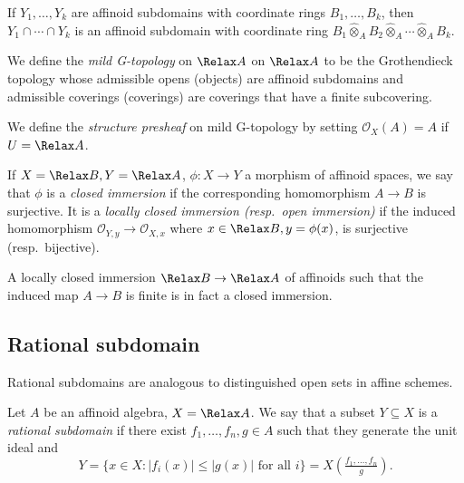 \documentclass[a4paper]{article}
\renewcommand*{\O}{\mathcal{O}}
\let\Sp\Relax
\DeclareMathOperator{\Sp}{Sp} %
\begin{document}
\begin{corollary}
  If \(Y_1, \dots, Y_k\) are affinoid subdomains with coordinate rings \(B_1, \dots, B_k\), then \(Y_1 \cap \cdots \cap Y_k\) is an affinoid subdomain with coordinate ring \(B_1 \hat \otimes_A B_2 \hat \otimes_A \cdots \hat \otimes_A B_k\).
\end{corollary}

\begin{definition}
  We define the \emph{mild G-topology} on \(\Sp A\) on \(\Sp A\) to be the Grothendieck topology whose admissible opens (objects) are affinoid subdomains and admissible coverings (coverings) are coverings that have a finite subcovering.
\end{definition}

We define the \emph{structure presheaf} on mild G-topology by setting \(\O_X(A) = A\) if \(U = \Sp A\).

\begin{definition}
  If \(X = \Sp B, Y = \Sp A\), \(\phi: X \to Y\) a morphism of affinoid spaces, we say that \(\phi\) is a \emph{closed immersion} if the corresponding homomorphism \(A \to B\) is surjective. It is a \emph{locally closed immersion (resp.\ open immersion)} if the induced homomorphism \(\O_{Y, y} \to \O_{X, x}\) where \(x \in \Sp B, y = \phi(x)\), is surjective (resp.\ bijective).
\end{definition}

\begin{ex}
  A locally closed immersion \(\Sp B \to \Sp A\) of affinoids such that the induced map \(A \to B\) is finite is in fact a closed immersion.
\end{ex}

\subsection{Rational subdomain}

Rational subdomains are analogous to distinguished open sets in affine schemes.

\begin{definition}
  Let \(A\) be an affinoid algebra, \(X = \Sp A\). We say that a subset \(Y \subseteq X\) is a \emph{rational subdomain} if there exist \(f_1, \dots, f_n, g \in A\) such that they generate the unit ideal and
  \[
    Y = \{x \in X: |f_i(x)| \leq |g(x)| \text{ for all } i\} = X(\tfrac{f_1, \dots, f_n}{g}).
  \]
\end{definition}
\end{document}
